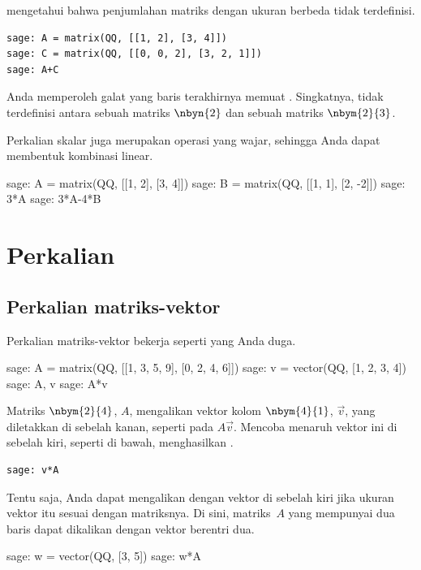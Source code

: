 \Sage{} mengetahui bahwa penjumlahan matriks dengan ukuran berbeda tidak terdefinisi.
\begin{lstlisting}
sage: A = matrix(QQ, [[1, 2], [3, 4]])
sage: C = matrix(QQ, [[0, 0, 2], [3, 2, 1]])
sage: A+C
\end{lstlisting}
Anda memperoleh galat yang baris terakhirnya memuat
.
Singkatnya, \inlinecode{+} tidak terdefinisi antara sebuah matriks
$\nbyn{2}$ dan sebuah matriks $\nbym{2}{3}$.

Perkalian skalar juga merupakan operasi yang wajar,
sehingga Anda dapat membentuk kombinasi linear.
\begin{sagecommandline}[d,0,2]
sage: A = matrix(QQ, [[1, 2], [3, 4]])
sage: B = matrix(QQ, [[1, 1], [2, -2]])
sage: 3*A
sage: 3*A-4*B
\end{sagecommandline}



\section{Perkalian}

\subsection{Perkalian matriks-vektor}
Perkalian matriks-vektor bekerja seperti yang Anda duga.
\begin{sagecommandline}
sage: A = matrix(QQ, [[1, 3, 5, 9], [0, 2, 4, 6]])
sage: v = vector(QQ, [1, 2, 3, 4])
sage: A, v
sage: A*v
\end{sagecommandline}
Matriks $\nbym{2}{4}$, $A$, mengalikan vektor kolom
$\nbym{4}{1}$, $\vec{v}$, yang diletakkan di sebelah kanan,
seperti pada $A\vec{v}$.
Mencoba menaruh vektor ini di sebelah kiri, seperti di bawah,
menghasilkan
.
\begin{lstlisting}
sage: v*A
\end{lstlisting}

Tentu saja, Anda dapat mengalikan dengan vektor di sebelah kiri
jika ukuran vektor itu sesuai dengan matriksnya.
Di sini, matriks~$A$ yang mempunyai dua baris dapat dikalikan dengan
vektor berentri dua.
\begin{sagecommandline}
sage: w = vector(QQ, [3, 5])
sage: w*A
\end{sagecommandline}




